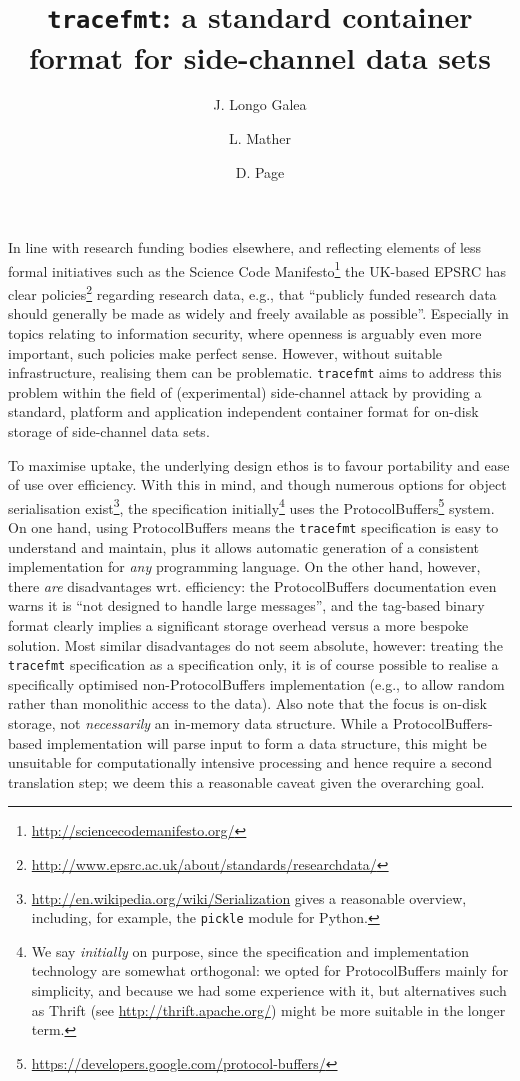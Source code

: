 \documentclass[10pt,a4paper]{llncs}
\title{{\tt tracefmt}: a standard container format for side-channel data sets}
\author{J. Longo Galea \and L. Mather \and D. Page}
\institute{
Department of Computer Science, University of Bristol,\\
Merchant Venturers Building, Woodland Road,\\
Bristol, BS8 1UB, United Kingdom.\\
\email{\{Jake.Longo,Luke.Mather,Daniel.Page\}@bristol.ac.uk}
}
\begin{document}
\maketitle


In line with research funding bodies elsewhere, and reflecting elements of
less formal initiatives such as the Science Code Manifesto\footnote{
\url{http://sciencecodemanifesto.org/}
} the UK-based EPSRC has clear policies\footnote{
\url{http://www.epsrc.ac.uk/about/standards/researchdata/}
} regarding research data, e.g., that ``publicly funded research data should 
generally be made as widely and freely available as possible''.  Especially
in topics relating to information security, where openness is arguably even 
more important, such policies make perfect sense.  However, without suitable
infrastructure, realising them can be problematic.  {\tt tracefmt} aims to 
address this problem within the field of (experimental) side-channel attack
by providing a standard, platform and application independent container 
format for on-disk storage of side-channel data sets.

To maximise uptake, the underlying design ethos is to favour portability and
ease of use over efficiency.  With this in mind, and though numerous options
for object serialisation exist\footnote{
\url{http://en.wikipedia.org/wiki/Serialization} gives a reasonable overview,
including, for example, the {\tt pickle} module for {\sf Python}.
}, the specification initially\footnote{
We say {\em initially} on purpose, since the specification and implementation
technology are somewhat orthogonal: we opted for {\sf ProtocolBuffers} mainly
for simplicity, and because we had some experience with it, but alternatives
such as {\sf Thrift} (see \url{http://thrift.apache.org/}) might be more
suitable in the longer term.
} uses the {\sf ProtocolBuffers}\footnote{
\url{https://developers.google.com/protocol-buffers/}
} system.  On one hand, using {\sf ProtocolBuffers} means the {\tt tracefmt} 
specification is easy to understand and maintain, plus it allows automatic 
generation of a consistent implementation for {\em any} programming language.  
On the other hand, however, there {\em are} disadvantages wrt. efficiency: 
the {\sf ProtocolBuffers} documentation even warns it is ``not designed to 
handle large messages'', and the tag-based binary format clearly implies a 
significant storage overhead versus a more bespoke solution.  Most similar
disadvantages do not seem absolute, however: treating the {\tt tracefmt} 
specification as a specification only, it is of course possible to realise 
a specifically optimised non-{\sf ProtocolBuffers} implementation (e.g., to 
allow random rather than monolithic access to the data).  Also note that the 
focus is on-disk storage, not {\em necessarily} an in-memory data structure.  
While a {\sf ProtocolBuffers}-based implementation will parse input to form 
a data structure, this might be unsuitable for computationally intensive 
processing and hence require a second translation step; we deem this a 
reasonable caveat given the overarching goal.
\end{document}
